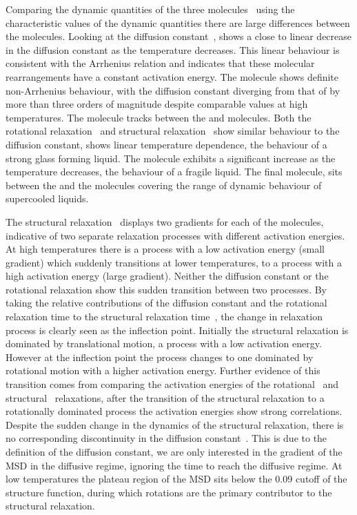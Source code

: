 Comparing the dynamic quantities of the three molecules~ using the characteristic values of the dynamic quantities there are large differences between the molecules. Looking at the diffusion constant~, \done shows a close to linear decrease in the diffusion constant as the temperature decreases. This linear behaviour is consistent with the Arrhenius relation and indicates that these molecular rearrangements have a constant activation energy. The \dcon molecule shows definite non-Arrhenius behaviour, with the diffusion constant diverging from that of \done by more than three orders of magnitude despite comparable values at high temperatures. The \tri molecule tracks between the \done and \dcon molecules. Both the rotational relaxation~ and structural relaxation~ show similar behaviour to the diffusion constant, \done shows linear temperature dependence, the behaviour of a strong glass forming liquid. The \dcon molecule exhibits a significant increase as the temperature decreases, the behaviour of a fragile liquid. The final molecule, \tri sits between the \done and the \dcon molecules covering the range of dynamic behaviour of supercooled liquids.

The structural relaxation~ displays two gradients for each of the molecules, indicative of two separate relaxation processes with different activation energies. At high temperatures there is a process with a low activation energy (small gradient) which suddenly transitions at lower temperatures, to a process with a high activation energy (large gradient). Neither the diffusion constant or the rotational relaxation show this sudden transition between two processes. By taking the relative contributions of the diffusion constant and the rotational relaxation time to the structural relaxation time~, the change in relaxation process is clearly seen as the inflection point. Initially the structural relaxation is dominated by translational motion, a process with a low activation energy. However at the inflection point the process changes to one dominated by rotational motion with a higher activation energy. Further evidence of this transition comes from comparing the activation energies of the rotational~ and structural~ relaxations, after the transition of the structural relaxation to a rotationally dominated process the activation energies show strong correlations. Despite the sudden change in the dynamics of the structural relaxation, there is no corresponding discontinuity in the diffusion constant~. This is due to the definition of the diffusion constant, we are only interested in the gradient of the MSD in the diffusive regime, ignoring the time to reach the diffusive regime. At low temperatures the plateau region of the MSD sits below the 0.09 cutoff of the structure function, during which rotations are the primary contributor to the structural relaxation. 

